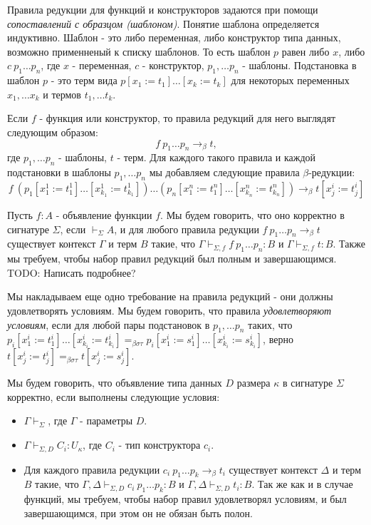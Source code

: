 \documentclass{amsart}
\theoremstyle{definition}
\theoremstyle{remark}
\newcommand{\bs}{\beta\sigma}
\newcommand{\bst}{\bs\tau}
\newcommand{\ebst}{=_{\bst}}
\numberwithin{figure}{section}
\begin{document}
Правила редукции для функций и конструкторов задаются при помощи \emph{сопоставлений с образцом (шаблоном)}.
Понятие шаблона определяется индуктивно.
Шаблон - это либо переменная, либо конструктор типа данных, возможно применненый к списку шаблонов.
То есть шаблон $p$ равен либо $x$, либо $c\ p_1 \ldots p_n$, где $x$ - переменная, $c$ - конструктор, $p_1, \ldots p_n$ - шаблоны.
Подстановка в шаблон $p$ - это терм вида $p[x_1 := t_1] \ldots [x_k := t_k]$ для некоторых переменных $x_1, \ldots x_k$ и термов $t_1, \ldots t_k$.

Если $f$ - функция или конструктор, то правила редукций для него выглядят следующим образом:
\[ f\ p_1 \ldots p_n \to_\beta t, \]
где $p_1, \ldots p_n$ - шаблоны, $t$ - терм.
Для каждого такого правила и каждой подстановки в шаблоны $p_1, \ldots p_n$ мы добавляем следующие правила $\beta$-редукции:
\[ f\ (p_1[x^1_1 := t^1_1] \ldots [x^1_{k_1} := t^1_{k_1}]) \ldots (p_n[x^n_1 := t^n_1] \ldots [x^n_{k_n} := t^n_{k_n}]) \to_\beta t[x^i_j := t^i_j] \]

Пусть $f : A$ - объявление функции $f$.
Мы будем говорить, что оно корректно в сигнатуре $\Sigma$, если $\vdash_\Sigma A$, и для любого правила редукции $f\ p_1 \ldots p_n \to_\beta t$
    существует контекст $\Gamma$ и терм $B$ такие, что $\Gamma \vdash_{\Sigma,f} f\ p_1 \ldots p_n : B$ и $\Gamma \vdash_{\Sigma,f} t : B$.
Также мы требуем, чтобы набор правил редукций был полным и завершающимся. TODO: Написать подробнее?

Мы накладываем еще одно требование на правила редукций - они должны удовлетворять условиям.
Мы будем говорить, что правила \emph{удовлетворяют условиям}, если для любой пары подстановок в $p_1, \ldots p_n$ таких,
    что $p_i[x^i_1 := t^i_1] \ldots [x^i_{k_i} := t^i_{k_i}] \ebst p_i[x^i_1 := s^i_1] \ldots [x^i_{k_i} := s^i_{k_i}]$,
    верно $t[x^i_j := t^i_j] \ebst t[x^i_j := s^i_j]$.

Мы будем говорить, что объявление типа данных $D$ размера $\kappa$ в сигнатуре $\Sigma$ корректно, если выполнены следующие условия:
\begin{itemize}
\item $\Gamma \vdash_\Sigma$, где $\Gamma$ - параметры $D$.
\item $\Gamma \vdash_{\Sigma,D} C_i : U_\kappa$, где $C_i$ - тип конструктора $c_i$.
\item Для каждого правила редукции $c_i\ p_1 \ldots p_k \to_\beta t_i$ существует контекст $\Delta$ и терм $B$ такие,
    что $\Gamma, \Delta \vdash_{\Sigma,D} c_i\ p_1 \ldots p_k : B$ и $\Gamma, \Delta \vdash_{\Sigma,D} t_i : B$.
    Так же как и в случае функций, мы требуем, чтобы набор правил удовлетворял условиям, и был завершающимся, при этом он не обязан быть полон.
\end{itemize}
\end{document}
